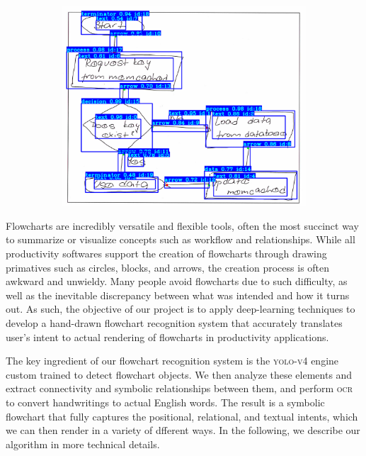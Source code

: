 \documentclass[10pt]{article}
\begin{document}
\begin{figure}[h]
\begin{subfigure}{0.30\columnwidth}
\end{subfigure}
\begin{subfigure}{0.30\columnwidth}
\includegraphics[width=\columnwidth]{sample.png}
\end{subfigure}
\end{figure}

Flowcharts are incredibly versatile and flexible tools, often the most
succinct way to summarize or visualize concepts such as workflow and
relationships.
While all productivity softwares support the creation of flowcharts through
drawing primatives such as circles, blocks, and arrows, the creation
process is often awkward and unwieldy.  Many people avoid flowcharts due to such
difficulty, as well as the inevitable discrepancy between what was intended and how it
turns out. As such, 
the objective of our project is to apply deep-learning techniques to develop a
hand-drawn flowchart recognition system
that accurately translates user's intent to actual rendering of flowcharts in
productivity applications.

The key ingredient of our flowchart recognition system is the
\textsc{yolo-v4} engine custom trained to detect flowchart objects.
We then analyze these elements and extract connectivity and
symbolic relationships between them, and perform \textsc{ocr} to convert
handwritings to actual English words. The result is a symbolic flowchart that fully
captures the positional, relational, and textual intents, which we can then render
in a variety of dfferent ways.
In the following, we describe our algorithm in more technical details.
\end{document}
